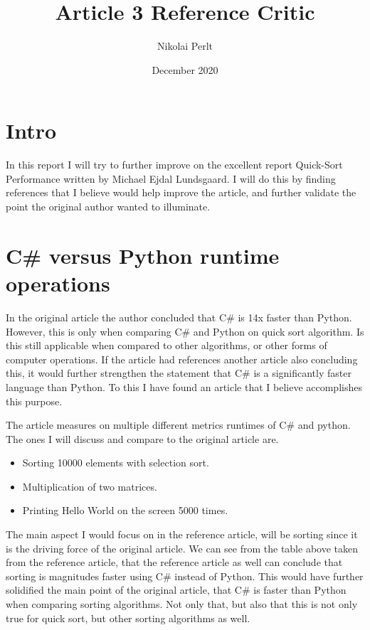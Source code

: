 \documentclass{article}
\title{Article 3 Reference Critic}
\author{Nikolai Perlt}
\date{December 2020}
\begin{document}
  
\maketitle




\section*{Intro}
In this report I will try to further improve on the excellent report Quick-Sort Performance written by Michael Ejdal Lundsgaard\cite{orginalArticle}. I will do this by finding references that I believe would help improve the article, and further validate the point the original author wanted to illuminate.  

\section*{C\# versus Python runtime operations}
In the original article the author concluded that C\# is 14x faster than Python. However, this is only when comparing C\# and Python on quick sort algorithm. Is this still applicable when compared to other algorithms, or other forms of computer operations. If the article had references another article also concluding this, it would further strengthen the statement that C\# is a significantly faster language than Python. To this I have found an article that I believe accomplishes this purpose\cite{CSvPythonRuntime}. %


The article measures on multiple different metrics runtimes of C\# and python. The ones I will discuss and compare to the original article are.

\begin{itemize}
  \item Sorting 10000 elements with selection sort.
  \item Multiplication of two matrices.
  \item Printing Hello World on the screen 5000 times.  
\end{itemize}
The main aspect I would focus on in the reference article, will be sorting since it is the driving force of the original article. We can see from the table above taken from the reference article, that the reference article as well can conclude that sorting is magnitudes faster using C\# instead of Python. This would have further solidified the main point of the original article, that C\# is faster than Python when comparing sorting algorithms. Not only that, but also that this is not only true for quick sort, but other sorting algorithms as well.
\end{document}
